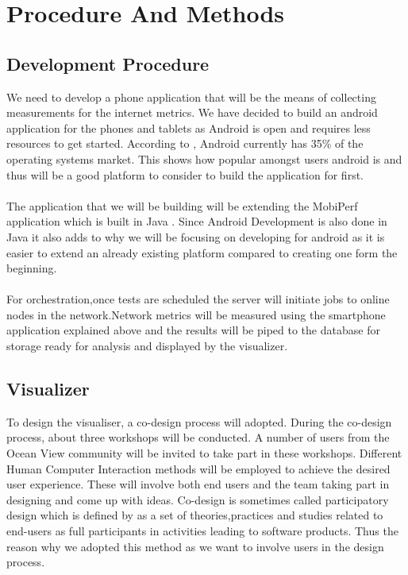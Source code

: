\section{Procedure And Methods}
\subsection{Development Procedure}
We need to develop a phone application that will be the means of collecting measurements for the internet metrics. We have decided to build an android application for the phones and tablets as Android is open and requires less resources to get started. According to \cite{statcounter_global_stats}, Android currently has 35\% of the operating systems market. This shows how popular amongst users android is and thus will be a good platform to consider to build the application for first. 
\paragraph{}
The application that we will be building will be extending the MobiPerf application which is built in Java \cite{m-lab}. Since Android Development is also done in Java it also adds to why we will be focusing on developing for android as it is easier to extend an already existing platform compared to creating one form the beginning.

\paragraph{}
For orchestration,once tests are scheduled the server will initiate jobs to online nodes in the network.Network metrics will be measured using the smartphone application explained above and the results will be piped to the database for storage ready for analysis and displayed by the visualizer.    

\subsection{Visualizer}
To design the visualiser, a co-design process will adopted. During the co-design process, about three workshops  will be conducted. A number of users from the Ocean View community will be invited to take part in these workshops. Different Human Computer Interaction methods will be employed to achieve the desired user experience. These will involve both end users and the team taking part in designing and come up with ideas. Co-design is sometimes called participatory design which is defined by \cite{ctx2100202260004041} as a set of theories,practices and studies related to end-users as full participants in activities leading to software products. Thus the reason why we adopted this method as we want to involve users in the design process.
